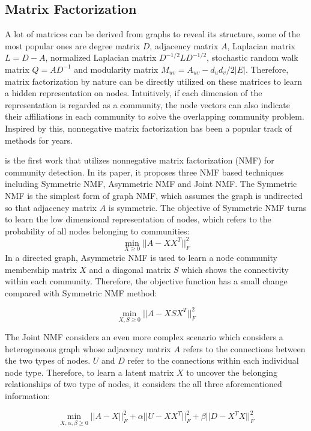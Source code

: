 \subsection{Matrix Factorization}
A lot of matrices can be derived from graphs to reveal its structure, some of the most popular ones are degree matrix $D$, adjacency matrix $A$, Laplacian matrix$L = D-A$, normalized Laplacian matrix $D^{-1/2}LD^{-1/2}$, stochastic random walk matrix $Q=AD^{-1}$ and modularity matrix $M_{uv} = A_{uv}-d_ud_v/2|E|$. Therefore, matrix factorization by nature can be directly utilized on these matrices to learn a hidden representation on nodes. Intuitively, if each dimension of the representation is regarded as a community, the node vectors can also indicate their affiliations in each community to solve the overlapping community problem. Inspired by this, nonnegative matrix factorization has been a popular track of methods for years.

\cite{wang2011community} is the first work that utilizes nonnegative matrix factorization (NMF) for community detection. In its paper, it proposes three NMF based techniques including Symmetric NMF, Asymmetric NMF and Joint NMF. The Symmetric NMF is the simplest form of graph NMF, which assumes the graph is undirected so that adjacency matrix $A$ is symmetric. The objective of Symmetric NMF turns to learn the low dimensional representation of nodes, which refers to the probability of all nodes belonging to communities:
\begin{equation}
		\min_{X \geq 0} ||A-XX^T||^2_F
\end{equation}
In a directed graph, Asymmetric NMF is used to learn a node community membership matrix $X$ and a diagonal matrix $S$ which shows the connectivity within each community. Therefore, the objective function has a small change compared with Symmetric NMF method:

\begin{equation}
\min_{X,S \geq 0} ||A-XSX^T||^2_F
\end{equation}

The Joint NMF considers an even more complex scenario which considers a heterogeneous graph whose adjacency matrix $A$ refers to the connections between the two types of nodes. $U$ and $D$ refer to the connections within each individual node type. Therefore, to learn a latent matrix $X$ to uncover the belonging relationships of two type of nodes, it considers the all three aforementioned information:  

 \begin{equation}
 \min_{X,\alpha, \beta \geq 0} ||A-X||^2_F + \alpha ||U-XX^T||^2_F + \beta ||D-X^T X||^2_F
 \end{equation}
 
